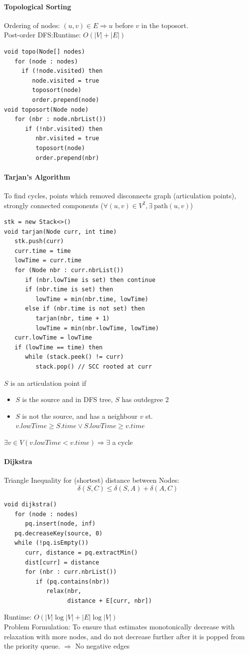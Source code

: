 \paragraph{Topological Sorting}
Ordering of nodes: $(u, v)\in E\Rightarrow u$ before $v$ in the toposort.\\
Post-order DFS:\@ \textcolor{Bittersweet}{Runtime}: $O(|V|+|E|)$\@
\begin{verbatim}
void topo(Node[] nodes)
   for (node : nodes)
     if (!node.visited) then
        node.visited = true
        toposort(node)
        order.prepend(node)
void toposort(Node node)
   for (nbr : node.nbrList())
      if (!nbr.visited) then
         nbr.visited = true
         toposort(node)
         order.prepend(nbr)
\end{verbatim}
\paragraph{Tarjan's Algorithm}
To find cycles, points which removed disconnects graph (articulation points), strongly
connected components ($\forall(u,v)\in V^{2}, \exists\ \text{path}(u,v)$)
\begin{verbatim}
stk = new Stack<>()
void tarjan(Node curr, int time)
   stk.push(curr)
   curr.time = time
   lowTime = curr.time
   for (Node nbr : curr.nbrList())
      if (nbr.lowTime is set) then continue
      if (nbr.time is set) then
         lowTime = min(nbr.time, lowTime)
      else if (nbr.time is not set) then
         tarjan(nbr, time + 1)
         lowTime = min(nbr.lowTime, lowTime)
   curr.lowTime = lowTime
   if (lowTime == time) then
      while (stack.peek() != curr)
         stack.pop() // SCC rooted at curr
\end{verbatim}
$S$ is an articulation point if
\begin{itemize}
  \item $S$ is the source and in DFS tree, $S$ has outdegree 2
  \item $S$ is not the source, and has a neighbour $v$ st. $v.lowTime \ge
    S.time \vee S.lowTime \ge v.time$
\end{itemize}
$\exists v\in V (v.lowTime< v.time)\Rightarrow \exists$ a cycle
\paragraph{Dijkstra}
Triangle Inequality for (shortest) distance between Nodes:
\[\delta(S, C)\le \delta(S, A) + \delta(A, C)\]
\begin{verbatim}
void dijkstra()
   for (node : nodes)
      pq.insert(node, inf)
   pq.decreaseKey(source, 0)
   while (!pq.isEmpty())
      curr, distance = pq.extractMin()
      dist[curr] = distance
      for (nbr : curr.nbrList())
         if (pq.contains(nbr))
            relax(nbr,
                  distance + E[curr, nbr])
\end{verbatim}
\textcolor{Bittersweet}{Runtime}: $O(|V|\log|V|+|E|\log|V|)$\\
Problem Formulation: To ensure that estimates monotonically decrease with
relaxation with more nodes, and do not decrease further after it is popped from
the priority queue. $\Rightarrow$ No negative edges
